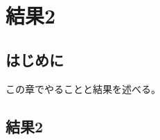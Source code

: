 \documentclass[../thesis]{subfiles}
\begin{document}
\chapter{結果2}
\section{はじめに}
この章でやることと結果を述べる。
\section{結果2}
\end{document}
